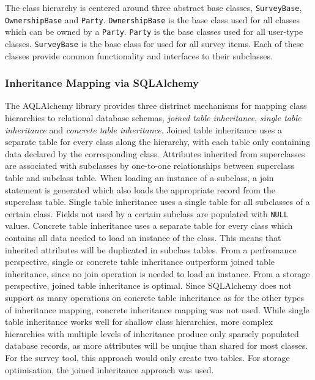 \documentclass[a4paper,11pt]{article}
\def\inline{\lstinline[basicstyle=\ttfamily,keywordstyle={}]}
\begin{document}
                The class hierarchy is centered around three abstract base classes,
                \inline{SurveyBase}, \inline{OwnershipBase} and \inline{Party}.
                \inline{OwnershipBase} is the base class used for all classes
                which can be owned by a \inline{Party}. \inline{Party} is
                the base classes used for all user-type classes. \inline{SurveyBase}
                is the base class for used for all survey items.
                Each of these classes provide common functionality and
                interfaces to their subclasses.

            \subsubsection{Inheritance Mapping via SQLAlchemy}
                The AQLAlchemy library provides three distrinct mechanisms
                for mapping class hierarchies to relational database schemas,
                \textit{joined table inheritance}, \textit{single table inheritance}
                and \textit{concrete table inheritance}.
                Joined table inheritance uses a separate table for every
                class along the hierarchy, with each table only
                containing data declared by the corresponding class.
                Attributes inherited from superclasses are associated
                with subclasses by one-to-one relationships between
                superclass table and subclass table. When loading
                an instance of a subclass, a join statement is generated
                which also loads the appropriate record from the superclass
                table. Single table inheritance uses a single table
                for all subclasses of a certain class. Fields
                not used by a certain subclass are populated with \inline{NULL}
                values. Concrete table inheritance uses a separate table for
                every class which contains all data needed to load an
                instance of the class. This means that inherited attributes
                will be duplicated in subclass tables.
                From a perfromance perspective, single or concrete table
                inheritance outperform joined table inheritance, since
                no join operation is needed to load an instance.
                From a storage perspective, joined table inheritance is
                optimal. Since SQLAlchemy does not support as many
                operations on concrete table inheritance as for the
                other types of inheritance mapping, concrete inheritance
                mapping was not used. While single table inheritance
                works well for shallow class hierarchies, more
                complex hierarchies with multiple levels of inheritance
                produce only sparsely populated database records, as more attributes
                will be unqiue than shared for most classes.
                For the survey tool, this approach would only create
                two tables. For storage optimisation, the joined
                inheritance approach was used.
\end{document}
